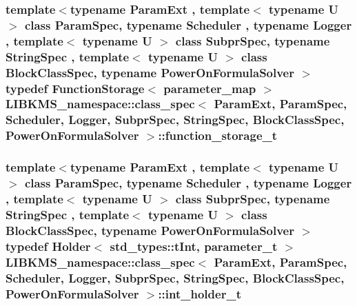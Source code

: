 \hypertarget{structLIBKMS__namespace_1_1class__spec_a9dfd29f88c6c529d8825656ab6753705}{
\subsubsection[{function\-\_\-storage\-\_\-t}]{\setlength{\rightskip}{0pt plus 5cm}template$<$typename Param\-Ext , template$<$ typename U $>$ class Param\-Spec, typename Scheduler , typename Logger , template$<$ typename U $>$ class Subpr\-Spec, typename String\-Spec , template$<$ typename U $>$ class Block\-Class\-Spec, typename Power\-On\-Formula\-Solver $>$ typedef {\bf Function\-Storage}$<$ {\bf parameter\-\_\-map} $>$ {\bf L\-I\-B\-K\-M\-S\-\_\-namespace\-::class\-\_\-spec}$<$ Param\-Ext, Param\-Spec, Scheduler, Logger, Subpr\-Spec, String\-Spec, Block\-Class\-Spec, Power\-On\-Formula\-Solver $>$\-::{\bf function\-\_\-storage\-\_\-t}}}\label{structLIBKMS__namespace_1_1class__spec_a9dfd29f88c6c529d8825656ab6753705}
\hypertarget{structLIBKMS__namespace_1_1class__spec_aacb3e2eca31377beaf0470dbdd2a8be7}{
\subsubsection[{int\-\_\-holder\-\_\-t}]{\setlength{\rightskip}{0pt plus 5cm}template$<$typename Param\-Ext , template$<$ typename U $>$ class Param\-Spec, typename Scheduler , typename Logger , template$<$ typename U $>$ class Subpr\-Spec, typename String\-Spec , template$<$ typename U $>$ class Block\-Class\-Spec, typename Power\-On\-Formula\-Solver $>$ typedef {\bf Holder}$<$ std\-\_\-types\-::t\-Int, {\bf parameter\-\_\-t} $>$ {\bf L\-I\-B\-K\-M\-S\-\_\-namespace\-::class\-\_\-spec}$<$ Param\-Ext, Param\-Spec, Scheduler, Logger, Subpr\-Spec, String\-Spec, Block\-Class\-Spec, Power\-On\-Formula\-Solver $>$\-::{\bf int\-\_\-holder\-\_\-t}}}\label{structLIBKMS__namespace_1_1class__spec_aacb3e2eca31377beaf0470dbdd2a8be7}
